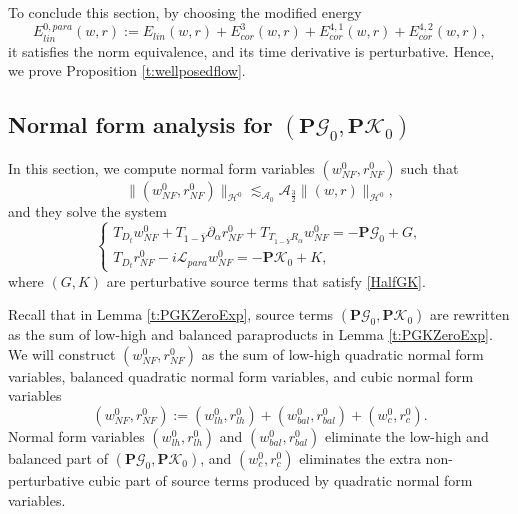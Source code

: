 \documentclass[10pt]{amsart}
\theoremstyle{remark}
\theoremstyle{definition}
\numberwithin{equation}{section}
\newcommand{\p}{\partial}
\renewcommand{\H}{{\mathcal H }}
\newcommand{\al}{\alpha}
\newcommand{\f}{\frac}
\newcommand{\nP}{{\mathbf P}}
\newcommand{\CalAZ}{{\mathcal{A}_0}}
\begin{document}
To conclude this section, by choosing the modified energy
\begin{equation} \label{E0ParaLinDef}
E^{0,para}_{lin}(w, r) := E_{lin}(w,r) + E^{3}_{cor}(w,r) + E^{4,1}_{cor}(w,r) + E^{4,2}_{cor}(w,r),
\end{equation}
it satisfies the norm equivalence, and its time derivative is perturbative.
Hence, we prove Proposition \ref{t:wellposedflow}.

\subsection{Normal form analysis for $(\nP\mathcal{G}_0, \nP\mathcal{K}_0)$} \label{s:NormalZero}
In this section, we compute normal form variables $(w_{NF}^0, r_{NF}^0)$ such that
\begin{equation} \label{wrNFHZeroBound}
    \|(w_{NF}^0, r_{NF}^0)\|_{\H^0} \lesssim_\CalAZ \mathcal{A}_{\f32} \|(w,r)\|_{\H^0},
\end{equation}
and they solve the system 
\begin{equation}  \label{wZeroNFPGKZero}
\begin{cases}
T_{D_t}w_{NF}^0+T_{1-\bar{Y}}\p_\al r_{NF}^0+T_{T_{1-\bar{Y}}R_{\al}}w_{NF}^0= -\nP \mathcal{G}_0 + G,\\
T_{D_t}r_{NF}^0-i\mathcal{L}_{para}w_{NF}^0=- \nP \mathcal{K}_0 +K,
\end{cases}
\end{equation}
where $(G,K)$ are perturbative source terms that satisfy \eqref{HalfGK}.

Recall that in Lemma \ref{t:PGKZeroExp}, source terms $(\nP\mathcal{G}_0, \nP\mathcal{K}_0)$ are rewritten as the sum of low-high and balanced paraproducts in Lemma \ref{t:PGKZeroExp}.
We will construct $(w_{NF}^0, r_{NF}^0)$ as the sum of low-high quadratic normal form variables,  balanced quadratic normal form variables, and cubic normal form variables
\begin{equation} \label{wrNFZeroDef}
 (w_{NF}^0, r_{NF}^0) := (w^0_{lh}, r^0_{lh}) + (w_{bal}^0, r_{bal}^0) + (w^0_c, r^0_{c}).   
\end{equation}
Normal form variables $(w^0_{lh}, r^0_{lh})$ and $(w_{bal}^0, r_{bal}^0)$ eliminate the low-high and balanced part of $(\nP\mathcal{G}_0, \nP\mathcal{K}_0)$,  and $(w^0_c, r^0_{c})$ eliminates the extra non-perturbative cubic part of source terms produced by quadratic normal form variables.
\end{document}
